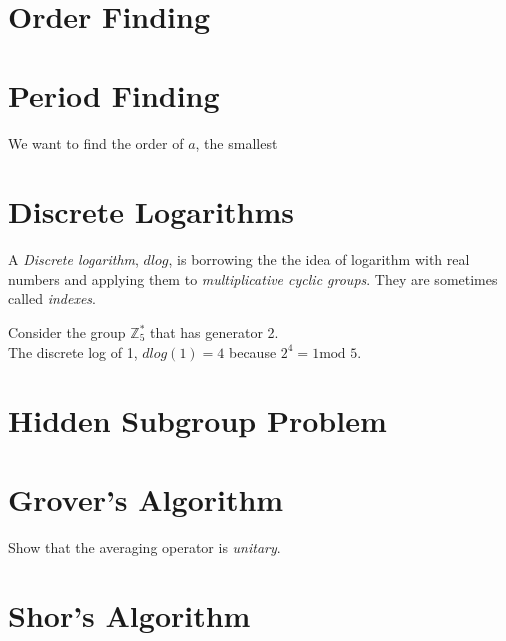 \section{Order Finding}

\section{Period Finding}



We want to find the order of $a$, the smallest 


\section{Discrete Logarithms}



A \textit{Discrete logarithm}, $dlog$, is borrowing the the idea of logarithm with real numbers 
and applying them to \textit{multiplicative cyclic groups}. 
They are sometimes called \textit{indexes}.

\begin{example}
Consider the group $\mathbb{Z}^{*}_{5}$ that has generator 2. \\ 
The discrete log of 1, $dlog(1) = 4$ because $2^4 = 1 \text{mod } 5$.
\end{example}

\frmrule

\section{Hidden Subgroup Problem}



\section{Grover's Algorithm}

\begin{example}
Show that the averaging operator is \textit{unitary}.
\end{example}


\section{Shor's Algorithm}